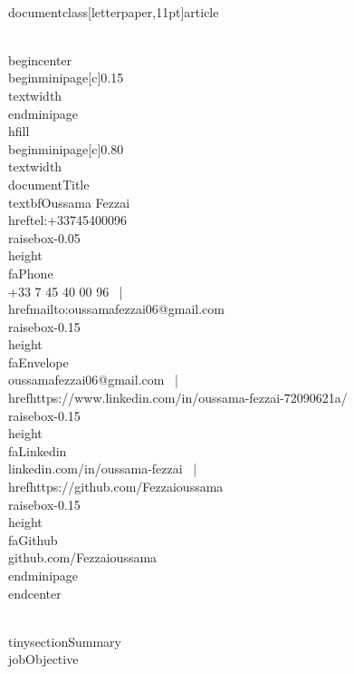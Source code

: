 \\documentclass[letterpaper,11pt]{article}
\begin{document}
\\begin{center}
  \\begin{minipage}[c]{0.15\\textwidth}
  \\end{minipage}\\hfill
  \\begin{minipage}[c]{0.80\\textwidth}
    \\documentTitle{\\textbf{Oussama Fezzai}}{
      \\href{tel:+33745400096}{\\raisebox{-0.05\\height}\\faPhone\\ +33 7 45 40 00 96} ~|~
      \\href{mailto:oussamafezzai06@gmail.com}{\\raisebox{-0.15\\height}\\faEnvelope\\ oussamafezzai06@gmail.com} ~|~
      \\href{https://www.linkedin.com/in/oussama-fezzai-72090621a/}{\\raisebox{-0.15\\height}\\faLinkedin\\ linkedin.com/in/oussama-fezzai} ~|~
      \\href{https://github.com/Fezzaioussama}{\\raisebox{-0.15\\height}\\faGithub\\ github.com/Fezzaioussama}
    }
  \\end{minipage}
\\end{center}

\\tinysection{Summary}
\\jobObjective
\end{document}
